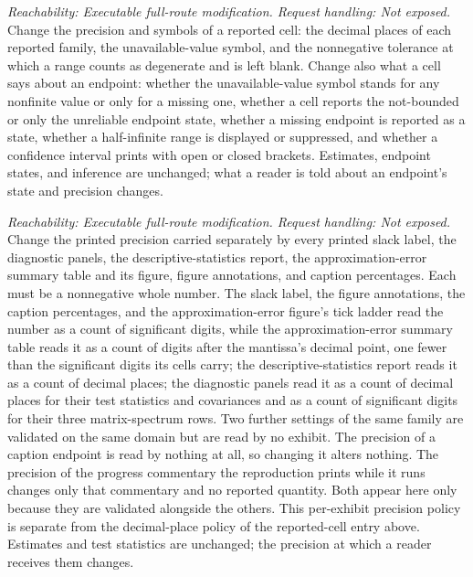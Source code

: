 \documentclass[11pt]{article}
\begin{document}
\begin{description}[style=nextline]
\item[Reported-cell display and rounding policy.]
\emph{Reachability: Executable full-route modification. Request handling: Not exposed.}
Change the precision and symbols of a reported cell: the decimal places of each reported family,
the unavailable-value symbol, and the nonnegative tolerance at which a range counts as degenerate
and is left blank. Change also what a cell says about an endpoint: whether the unavailable-value
symbol stands for any nonfinite value or only for a missing one, whether a cell reports the
not-bounded or only the unreliable endpoint state, whether a missing endpoint is reported as a
state, whether a half-infinite range is displayed or suppressed, and whether a confidence interval
prints with open or closed brackets. Estimates, endpoint states, and inference are unchanged; what a
reader is told about an endpoint's state and precision changes.

\item[Reported precision by exhibit.]
\emph{Reachability: Executable full-route modification. Request handling: Not exposed.}
Change the printed precision carried separately by every printed slack label, the diagnostic
panels, the descriptive-statistics report, the approximation-error summary table and its figure,
figure annotations, and caption percentages. Each must be a nonnegative whole number. The slack
label, the figure annotations, the caption percentages, and the approximation-error figure's tick
ladder read the number as a count of significant digits, while the approximation-error summary table
reads it as a count of digits after the mantissa's decimal point, one fewer than the significant
digits its cells carry; the descriptive-statistics report reads it as a count
of decimal places; the diagnostic panels read it as a count of decimal places for their test
statistics and covariances and as a count of significant digits for their three matrix-spectrum
rows. Two further settings of the same family are validated on the same domain but are read by no
exhibit. The precision of a caption endpoint is read by nothing at all, so changing it alters
nothing. The precision of the progress commentary the reproduction prints while it runs changes only
that commentary and no reported quantity. Both appear here only because they are validated alongside
the others. This per-exhibit precision policy is separate from the
decimal-place policy of the reported-cell entry above. Estimates
and test statistics are unchanged; the precision at which a reader receives them changes.


\end{description}
\end{document}
